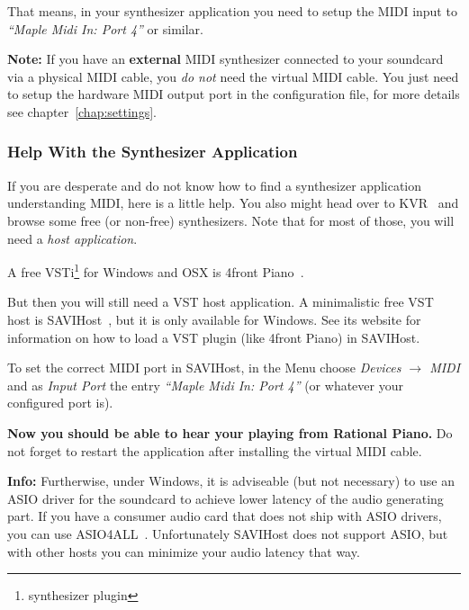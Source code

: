 \documentclass[12pt,a4paper,titlepage,oneside]{report}
\begin{document}
That means, in your synthesizer application you need to setup the MIDI input to \emph{``Maple Midi In: Port 4''} or similar.

\textbf{Note:} If you have an \textbf{external} MIDI synthesizer connected to your soundcard via a physical MIDI cable, you \emph{do not} need the virtual MIDI cable. You just need to setup the hardware MIDI output port in the configuration file, for more details see chapter~\ref{chap:settings}.

\subsubsection{Help With the Synthesizer Application}

If you are desperate and do not know how to find a synthesizer application understanding MIDI, here is a little help. You also might head over to KVR~\cite{bib:kvr} and browse some free (or non-free) synthesizers. Note that for most of those, you will need a \emph{host application}.

A free VSTi\footnote{synthesizer plugin} for Windows and OSX is 4front Piano~\cite{bib:4front}.

But then you will still need a VST host application. A minimalistic free VST host is SAVIHost~\cite{bib:savi}, but it is only available for Windows. See its website for information on how to load a VST plugin (like 4front Piano) in SAVIHost.

To set the correct MIDI port in SAVIHost, in the Menu choose \emph{Devices $\rightarrow$ MIDI} and as \emph{Input Port} the entry \emph{``Maple Midi In: Port 4''} (or whatever your configured port is).

\textbf{Now you should be able to hear your playing from Rational Piano.} Do not forget to restart the application after installing the virtual MIDI cable.

\textbf{Info:} Furtherwise, under Windows, it is adviseable (but not necessary) to use an ASIO driver for the soundcard to achieve lower latency of the audio generating part. If you have a consumer audio card that does not ship with ASIO drivers, you can use ASIO4ALL~\cite{bib:asio4all}. Unfortunately SAVIHost does not support ASIO, but with other hosts you can minimize your audio latency that way.
\end{document}
